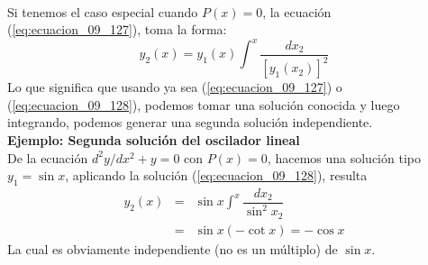 \\
Si tenemos el caso especial cuando $P(x)=0$, la ecuación (\ref{eq:ecuacion_09_127}), toma la forma:
\begin{equation}
y_{2}(x) =  y_{1}(x) \int^{x} \dfrac{dx_{2}}{[y_{1}(x_{2})]^{2}}
\label{eq:ecuacion_09_128}
\end{equation}
Lo que significa que usando ya sea (\ref{eq:ecuacion_09_127}) o (\ref{eq:ecuacion_09_128}), podemos tomar una solución conocida y luego integrando, podemos generar una segunda solución independiente.
\\
\textbf{Ejemplo: Segunda solución del oscilador lineal}
\\
De la ecuación $d^{2} y / dx^{2} + y = 0$ con $P(x)=0$, hacemos una solución tipo $y_{1} = \sin x$, aplicando la solución (\ref{eq:ecuacion_09_128}), resulta
\begin{eqnarray*}
y_{2}(x) &=& \sin x \int^{x} \dfrac{dx_{2}}{\sin^{2} x_{2}} \\
&=& \sin x (-\cot x) = - \cos x
\end{eqnarray*}
La cual es obviamente independiente (no es un múltiplo) de $\sin x$.
